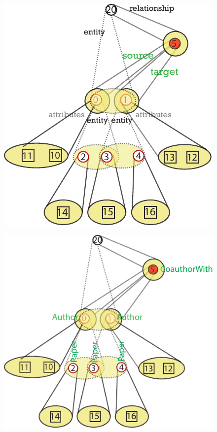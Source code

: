 \begin{figure}
	\centering
	\hspace*{-2cm}
	\begin{minipage}{.5\textwidth}
		\centering
		\includegraphics{fig/04model/0401Expressions_F}
		\label{fig:0402Labels}
	\end{minipage}\quad  \begin{minipage}{.5\textwidth}
	\centering
	\includegraphics{fig/04model/0401Labels_F}

\end{minipage}
\end{figure}
